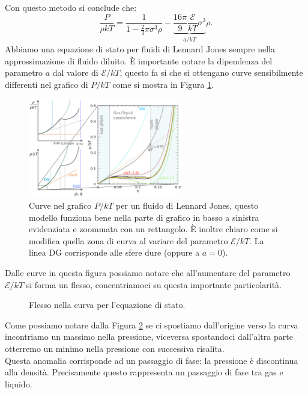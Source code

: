 Con questo metodo si conclude che:
\[
	\frac{P}{\rho kT} 
	=
	\frac{1}{1- \frac{2}{3}\pi\sigma^3\rho }
	-
\underbrace{
	\frac{16\pi}{9}\frac{\mathcal{E}}{kT}\sigma^3
}_{a/kT}	
	\rho 
.\] 
Abbiamo una equazione di stato per fluidi di Lennard Jones sempre nella approssimazione di fluido diluito. È importante notare la dipendenza del parametro $a$ dal valore di $\mathcal{E} /kT$, questo fa si che si ottengano curve sensibilmente differenti nel grafico di $P/kT$ come si mostra in Figura \ref{fig:-figures-Wan-Der-Waals-curve-dipendenza-ekT-png}.
\begin{figure}[ht]
	\centering
	\includegraphics[width=0.6\textwidth]{figures/Wan-Der-Waals-curve--dipendenza-ekT.png}
	\caption{\scriptsize Curve nel grafico $P/kT$ per un fluido di Lennard Jones,
	questo modello funziona bene nella parte di grafico in basso a sinistra 
	evidenziata e zoommata con un rettangolo. È inoltre chiaro come si modifica quella
	zona di curva al variare del parametro $\mathcal{E} /kT$. La linea DG corrisponde 
	alle sfere dure (oppure a $a=0$).}
	\label{fig:-figures-Wan-Der-Waals-curve-dipendenza-ekT-png}
\end{figure}
Dalle curve in questa figura possiamo notare che all'aumentare del parametro $\mathcal{E} /kT$ si forma un flesso, concentriamoci su questa importante particolarità. \\
\begin{figure}[ht]
    \centering
    \caption{Flesso nella curva per l'equazione di stato.}
    \label{fig:cambio-statoWDV}
\end{figure}
\noindent
Come possiamo notare dalla Figura \ref{fig:cambio-statoWDV} se ci spostiamo dall'origine verso la curva incontriamo un massimo nella pressione, viceversa spostandoci dall'altra parte otterremo un minimo nella pressione con successiva risalita. \\
Questa anomalia corrisponde ad un passaggio di fase: la pressione è discontinua alla densità. Precisamente questo rappresenta un passaggio di fase tra gas e liquido.
